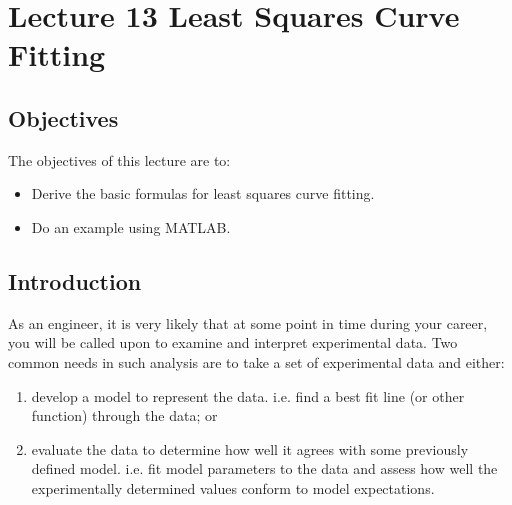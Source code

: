 \chapter{Lecture 13 Least Squares Curve Fitting}
\label{ch:lec13n}
\section{Objectives}
The objectives of this lecture are to:
\begin{itemize}
\item Derive the basic formulas for least squares curve fitting.
\item Do an example using MATLAB.
\end{itemize}
\setcounter{lstannotation}{0}

\section{Introduction}
As an engineer, it is very likely that at some point in time during your career,
you will be called upon to examine and interpret experimental data.  Two
common needs in such analysis are to take a set of experimental data and either:
\begin{enumerate}[label=\alph*.)]
\item develop a model to represent the data. i.e. find a best fit line (or
  other function) through
  the data; or
\item evaluate the data to determine how well it agrees with some previously
  defined model.  i.e. fit model parameters to the data and assess how well
  the experimentally determined values conform to model expectations.

\end{enumerate}

